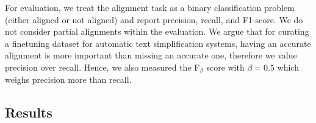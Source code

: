 \documentclass[11pt]{article}
\begin{document}
For evaluation, we treat the alignment task as a binary classification problem (either aligned or not aligned) and report precision, recall, and F1-score. We do not consider partial alignments within the evaluation. We argue that for curating a finetuning dataset for automatic text simplification systems, having an accurate alignment is more important than missing an accurate one, therefore we value precision over recall. Hence, we also measured the F$_{\beta}$ score with ${\beta=0.5}$ which weighs precision more than recall.

\begin{table}[htb]
\caption{Results of the alignment methods with $1$:$1$ (upper part) and $n$:$m$ capabilities (lower part) on sentence-pairs with $1$:$1$ (n=1750, left part) and $n$:$m$ alignments (n=991, right part).}

\label{alignment-methods-evaluation}
\end{table}


\subsection{Results}
\label{sec-deplain-sent-auto}
\end{document}
